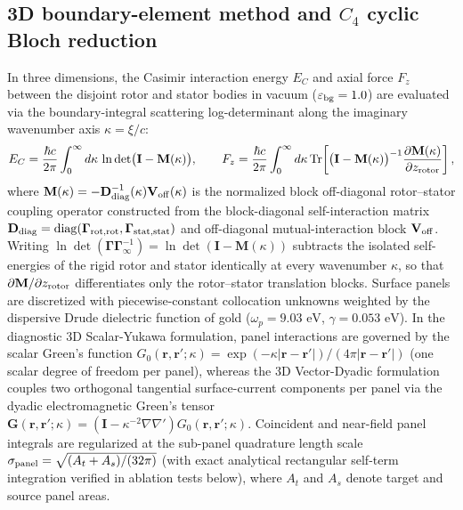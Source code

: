 \documentclass[pdflatex,sn-nature]{sn-jnl}
\begin{document}
\subsection*{3D boundary-element method and $C_4$ cyclic Bloch reduction}
In three dimensions, the Casimir interaction energy $E_C$ and axial force $F_z$ between the disjoint rotor and stator bodies in vacuum ($\varepsilon_{\rm bg}=1.0$) are evaluated via the boundary-integral scattering log-determinant along the imaginary wavenumber axis $\kappa = \xi/c$\cite{reid2013pra}:
\begin{equation}
E_C = \frac{\hbar c}{2\pi} \int_0^\infty d\kappa \, \ln\det\bigl(\mathbf{I} - \mathbf{M}(\kappa)\bigr),
\qquad
F_z = \frac{\hbar c}{2\pi} \int_0^\infty d\kappa \, \mathrm{Tr}\!\left[\bigl(\mathbf{I} - \mathbf{M}(\kappa)\bigr)^{-1} \frac{\partial \mathbf{M}(\kappa)}{\partial z_{\rm rotor}}\right],
\label{eq:methods_bem}
\end{equation}
where $\mathbf{M}(\kappa) = -\mathbf{D}_{\rm diag}^{-1}(\kappa)\mathbf{V}_{\rm off}(\kappa)$ is the normalized block off-diagonal rotor--stator coupling operator constructed from the block-diagonal self-interaction matrix $\mathbf{D}_{\rm diag} = \mathrm{diag}(\mathbf{\Gamma}_{\rm rot,rot}, \mathbf{\Gamma}_{\rm stat,stat})$ and off-diagonal mutual-interaction block $\mathbf{V}_{\rm off}$. Writing $\ln\det(\mathbf{\Gamma}\mathbf{\Gamma}_\infty^{-1}) = \ln\det(\mathbf{I} - \mathbf{M}(\kappa))$ subtracts the isolated self-energies of the rigid rotor and stator identically at every wavenumber $\kappa$, so that $\partial\mathbf{M}/\partial z_{\rm rotor}$ differentiates only the rotor--stator translation blocks. Surface panels are discretized with piecewise-constant collocation unknowns weighted by the dispersive Drude dielectric function of gold ($\omega_p = 9.03\text{ eV}$, $\gamma = 0.053\text{ eV}$)\cite{rakic1998}. In the diagnostic 3D Scalar-Yukawa formulation, panel interactions are governed by the scalar Green's function $G_0(\mathbf{r},\mathbf{r}';\kappa) = \exp(-\kappa |\mathbf{r}-\mathbf{r}'|)/(4\pi |\mathbf{r}-\mathbf{r}'|)$ (one scalar degree of freedom per panel), whereas the 3D Vector-Dyadic formulation couples two orthogonal tangential surface-current components per panel via the dyadic electromagnetic Green's tensor $\mathbf{G}(\mathbf{r},\mathbf{r}';\kappa) = (\mathbf{I} - \kappa^{-2}\nabla\nabla')G_0(\mathbf{r},\mathbf{r}';\kappa)$. Coincident and near-field panel integrals are regularized at the sub-panel quadrature length scale $\sigma_{\rm panel} = \sqrt{(A_t+A_s)/(32\pi)}$ (with exact analytical rectangular self-term integration verified in ablation tests below), where $A_t$ and $A_s$ denote target and source panel areas.
\end{document}
